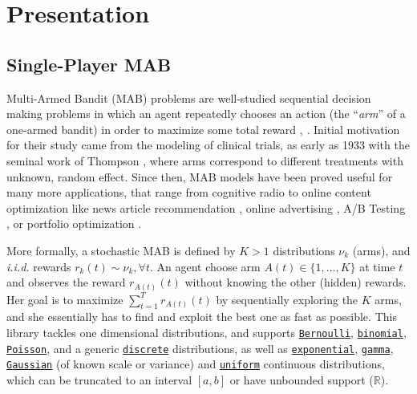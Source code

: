 \documentclass[a4paper,10pt,]{article}
\begin{document}

\section{Presentation}\label{presentation}

\subsection{Single-Player MAB}\label{single-player-mab}

Multi-Armed Bandit (MAB) problems are well-studied sequential decision
making problems in which an agent repeatedly chooses an action (the
``\emph{arm}'' of a one-armed bandit) in order to maximize some total
reward \citep{Robbins52}, \citep{LaiRobbins85}. Initial motivation for
their study came from the modeling of clinical trials, as early as 1933
with the seminal work of Thompson \citep{Thompson33}, where arms
correspond to different treatments with unknown, random effect. Since
then, MAB models have been proved useful for many more applications,
that range from cognitive radio \citep{Jouini09} to online content
optimization like news article recommendation \citep{Li10}, online
advertising \citep{LiChapelle11}, A/B Testing \citep{Kaufmann14,Jamieson17}, or portfolio optimization \citep{Sani12}.


More formally, a stochastic MAB is defined by $K>1$ distributions $\nu_k$ (arms),
and \emph{i.i.d.} rewards $r_k(t) \sim \nu_k, \forall t$.
An agent choose arm $A(t)\in\{1,\dots,K\}$ at time $t$ and
observes the reward $r_{A(t)}(t)$ without knowing the other (hidden) rewards.
Her goal is to maximize $\sum_{t=1}^T r_{A(t)}(t)$ by sequentially exploring the $K$ arms,
and she essentially has to find and exploit the best one as fast as possible.
This library tackles one dimensional distributions,
and supports \href{https://SMPyBandits.GitHub.io/docs/Arms.Bernoulli.html}{\texttt{Bernoulli}}, \href{https://SMPyBandits.GitHub.io/docs/Arms.Binomial.html}{\texttt{binomial}}, \href{https://SMPyBandits.GitHub.io/docs/Arms.Poisson.html}{\texttt{Poisson}}, and a generic \href{https://SMPyBandits.GitHub.io/docs/Arms.DiscreteArm.html}{\texttt{discrete}} distributions,
as well as \href{https://SMPyBandits.GitHub.io/docs/Arms.Exponential.html}{\texttt{exponential}}, \href{https://SMPyBandits.GitHub.io/docs/Arms.Gamma.html}{\texttt{gamma}}, \href{https://SMPyBandits.GitHub.io/docs/Arms.Gaussian.html}{\texttt{Gaussian}} (of known scale or variance) and \href{https://SMPyBandits.GitHub.io/docs/Arms.Uniform.html}{\texttt{uniform}} continuous distributions,
which can be truncated to an interval $[a,b]$ or have unbounded support ($\mathbb{R}$).
\end{document}
